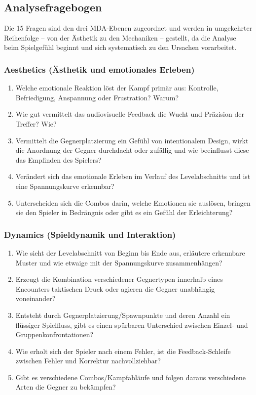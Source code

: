 \documentclass[10pt, a4paper]{article}
\begin{document}
\subsection{Analysefragebogen}

Die 15 Fragen sind den drei MDA-Ebenen zugeordnet und werden in umgekehrter Reihenfolge – von der Ästhetik zu den Mechaniken – gestellt, da die Analyse beim Spielgefühl beginnt und sich systematisch zu den Ursachen vorarbeitet.

\subsubsection{Aesthetics (Ästhetik und emotionales Erleben)}
\begin{enumerate}[label=\textbf{A\arabic*}, leftmargin=1.5cm, itemsep=0.5em]
    \item Welche emotionale Reaktion löst der Kampf primär aus: Kontrolle, Befriedigung, Anspannung oder Frustration? Warum?
    \item Wie gut vermittelt das audiovisuelle Feedback die Wucht und Präzision der Treffer? Wie?
    \item Vermittelt die Gegnerplatzierung ein Gefühl von intentionalem Design, wirkt die Anordnung der Gegner durchdacht oder zufällig und wie beeinflusst diese das Empfinden des Spielers?
    \item Verändert sich das emotionale Erleben im Verlauf des Levelabschnitts und ist eine Spannungskurve erkennbar?
    \item Unterscheiden sich die Combos darin, welche Emotionen sie auslösen, bringen sie den Spieler in Bedrängnis oder gibt es ein Gefühl der Erleichterung?
\end{enumerate}

\subsubsection{Dynamics (Spieldynamik und Interaktion)}
\begin{enumerate}[label=\textbf{D\arabic*}, leftmargin=1.5cm, itemsep=0.5em]
    \item Wie sieht der Levelabschnitt von Beginn bis Ende aus, erläutere erkennbare Muster und wie etwaige mit der Spannungskurve zusammenhängen?
    \item Erzeugt die Kombination verschiedener Gegnertypen innerhalb eines Encounters taktischen Druck oder agieren die Gegner unabhängig voneinander?
    \item Entsteht durch Gegnerplatzierung/Spawnpunkte und deren Anzahl ein flüssiger Spielfluss, gibt es einen spürbaren Unterschied zwischen Einzel- und Gruppenkonfrontationen?
    \item Wie erholt sich der Spieler nach einem Fehler, ist die Feedback-Schleife zwischen Fehler und Korrektur nachvollziehbar?
    \item Gibt es verschiedene Combos/Kampfabläufe und folgen daraus verschiedene Arten die Gegner zu bekämpfen?
\end{enumerate}
\end{document}
